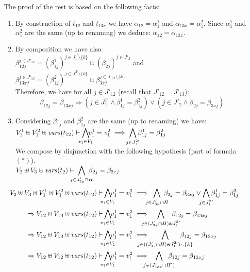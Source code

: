 \documentclass[runningheads]{llncs}
\begin{document}
\begin{enumerate}
The proof of the rest  is based on the following facts: 
\begin{enumerate}
\item     By construction of  $t_{12}$ and $t_{13x}$ we have $\alpha_{12}=
\alpha^1_{1}$ and $\alpha_{13x}=\alpha^2_{1}$. Since  $\alpha^1_{1}$ and  $\alpha^2_{1}$ are the same (up to renaming) we deduce: 
$\alpha_{12} = \alpha_{13x}$.
\item By composition we have also: \\ $\beta_{12j}^{j\in J'_{12}}= (\beta^1_{1j})^{j \in J^{1 \prime}_{1} \setminus \{k\}} \uplus   (\beta_{2j})^{j \in J'_{2} }$
and $\beta_{13xj}^{j\in J'_{13}}= (\beta^2_{1j})^{j \in J^{2 \prime}_{1}  \setminus \{k\}}  \uplus \beta_{3xj}^{j \in J'_{3x}  \setminus \{k\}}$\\
Therefore, we have for all $j\in J'_{12}$ (recall that $J'_{12}=J'_{13}$):  \[\beta_{12j} = \beta_{13xj} \Rightarrow (j\in J^{1\prime}_1 \land \beta^1_{1j} = \beta^2_{1j}) \vee (j\in J'_2 \land \beta_{2j}= \beta_{3xj})\]
\item 
Considering $\beta^1_{1j}$ and  $\beta^2_{1j}$  are the same (up to renaming)  we have: \\
${\displaystyle V^1_{1} \uplus V^2_{1} \uplus \fvars{t_{12}} \vdash \bigwedge_\subbox{v_1\in V_1}\!\! v^1_1=v^2_1\implies \bigwedge_\subbox{j \in J^{2 \prime}_1} \beta^1_{1j}= \beta^2_{1j}}$\\
We compose by disjunction with the following hypothesis (part of formula $(*)$).\\ $V_{2} \uplus V_{3} \uplus \fvars{t_2}  \vdash {\displaystyle \bigwedge_\subbox{j \in J'_{3x} \cap H} \beta_{2j} = \beta_{3xj}}$
\begin{align*}\hspace{-5ex}
 V_{2} \uplus V_{3}  \uplus V^1_{1} \uplus V^2_{1} \uplus \fvars{t_{12}}\vdash &    \bigwedge_\subbox{v_1\in V_1}\!\! v^1_1=v^2_1 \implies {\displaystyle \bigwedge_\subbox{j \in J'_{3x} \cap H} \beta_{2j} = \beta_{3xj}} \vee {\displaystyle \bigwedge_\subbox{j \in J^{2 \prime}_1} \beta^1_{1j}= \beta^2_{1j}}\\
\Rightarrow  V_{12} \uplus V_{13}  \uplus \fvars{t_{12}}\vdash & \bigwedge_\subbox{v_1\in V_1}\!\! v^1_1=v^2_1\implies {\displaystyle \bigwedge_\subbox{j \in (J'_{3x}   \cap H)\uplus J^{2 \prime}_1 } \beta_{12j} = \beta_{13xj}} \\  
\Rightarrow  V_{12} \uplus V_{13}  \uplus \fvars{t_{12}}\vdash & \bigwedge_\subbox{v_1\in V_1}\!\! v^1_1=v^2_1\implies {\displaystyle \bigwedge_\subbox{j \in    ((J'_{3x}   \cap H)\uplus J^{2 \prime}_1)\setminus \{k\} } \beta_{12j} = \beta_{13xj}} \\
\Rightarrow    V_{12} \uplus V_{12}  \uplus \fvars{t_{12}}\vdash & \bigwedge_\subbox{v_1\in V_1}\!\! v^1_1=v^2_1\implies {\displaystyle \bigwedge_\subbox{j \in (J'_{13x}   \cap H') } \beta_{12j} = \beta_{13xj}}
\end{align*}
\end{enumerate}


\end{enumerate}
\end{document}
